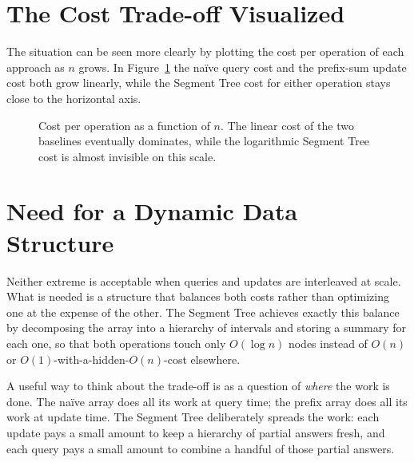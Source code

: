 \section{The Cost Trade-off Visualized}
The situation can be seen more clearly by plotting the cost per operation of each approach as $n$ grows. In Figure~\ref{fig:tradeoffplot} the na\"ive query cost and the prefix-sum update cost both grow linearly, while the Segment Tree cost for either operation stays close to the horizontal axis.

\begin{figure}[h]
\centering
{}
\caption{Cost per operation as a function of $n$. The linear cost of the two baselines eventually dominates, while the logarithmic Segment Tree cost is almost invisible on this scale.}
\label{fig:tradeoffplot}
\end{figure}

\section{Need for a Dynamic Data Structure}
Neither extreme is acceptable when queries and updates are interleaved at scale. What is needed is a structure that balances both costs rather than optimizing one at the expense of the other. The Segment Tree achieves exactly this balance by decomposing the array into a hierarchy of intervals and storing a summary for each one, so that both operations touch only $O(\log n)$ nodes instead of $O(n)$ or $O(1)$-with-a-hidden-$O(n)$-cost elsewhere.

\begin{remark}
A useful way to think about the trade-off is as a question of \emph{where} the work is done. The na\"ive array does all its work at query time; the prefix array does all its work at update time. The Segment Tree deliberately spreads the work: each update pays a small amount to keep a hierarchy of partial answers fresh, and each query pays a small amount to combine a handful of those partial answers.
\end{remark}

